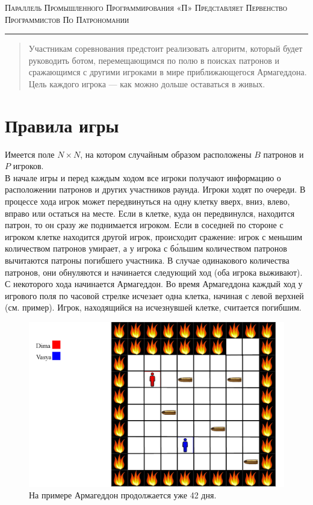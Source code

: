 \documentclass[a4paper,12pt]{article}
\begin{document}
\begin{center}
{\small\textsc{Параллель Промышленного Программирования «П» Представляет Первенство Программистов По Патрономании}}

\vskip 3pt \hrule \vskip 10pt

\end{center}
\begin{abstract}
Участникам соревнования предстоит реализовать алгоритм, который будет руководить ботом, перемещающимся по полю в поисках патронов и сражающимся с другими игроками в мире приближающегося Армагеддона. Цель каждого игрока --- как можно дольше оставаться в живых.
\end{abstract}

\section*{Правила игры}
Имеется поле $N\times N$, на котором случайным образом расположены $B$ патронов и $P$ игроков. \\ В начале игры и перед каждым ходом все игроки получают информацию о расположении патронов и других участников раунда. Игроки ходят по очереди. В процессе хода игрок может передвинуться на одну клетку вверх, вниз, влево, вправо или остаться на месте. Если в клетке, куда он передвинулся, находится патрон, то он сразу же поднимается игроком. Если в соседней по стороне с игроком клетке находится другой игрок, происходит сражение: игрок с меньшим количеством патронов умирает, а у игрока с б\'{о}льшим количеством патронов вычитаются патроны погибшего участника. В случае одинакового количества патронов, они обнуляются и начинается следующий ход (оба игрока выживают). С некоторого хода начинается Армагеддон. Во время Армагеддона каждый ход у игрового поля по часовой стрелке исчезает одна клетка, начиная с левой верхней (см. пример). Игрок, находящийся на исчезнувшей клетке, считается погибшим.
\begin{center}
\begin{figure}[h]
\includegraphics[width=150mm]{example1.png}
\caption{На примере Армагеддон продолжается уже 42 дня.}
\end{figure}
\end{center}
\end{document}
